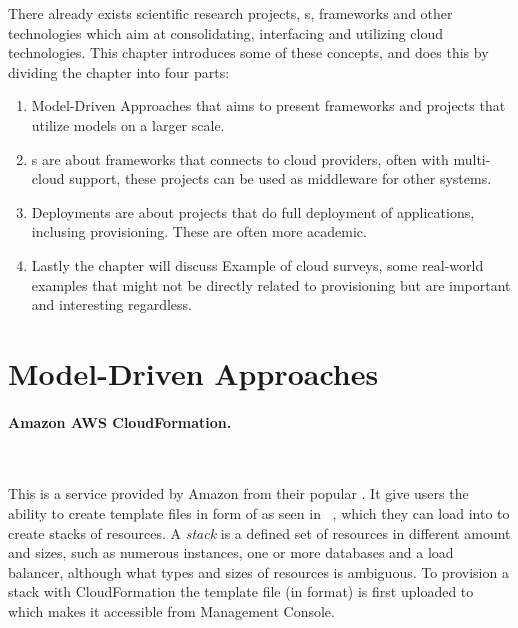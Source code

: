 
There already exists scientific research projects, s, frameworks 
and other technologies which aim at consolidating, interfacing and utilizing cloud technologies.
This chapter introduces some of these concepts, and does this by dividing the chapter into four parts:
\begin{enumerate}
  \item Model-Driven Approaches that aims to present frameworks and projects that utilize
  models on a larger scale.
  \item {}s are about frameworks that connects to cloud providers, often with multi-cloud support,
  these projects can be used as middleware for other systems.
  \item Deployments are about projects that do full deployment of applications, inclusing provisioning.
  These are often more academic.
  \item Lastly the chapter will discuss \iitem Example of cloud surveys, some real-world examples
  that might not be directly related to provisioning but are important and interesting regardless.
\end{enumerate}

\section{Model-Driven Approaches}

\paragraph{Amazon AWS CloudFormation.}~\cite{aws}



This is a service provided by Amazon from their popular .
It give users the ability to create template files in form of 
 as seen in ~, 
which they can load into  to create stacks of resources. 
A \emph{stack} is a defined set of resources in different amount and sizes, 
such as numerous instances,
one or more databases and a load balancer, although what types and sizes of resources is ambiguous.
To provision a stack with CloudFormation the template file (in  format) is first uploaded to
 which makes it accessible from  Management Console.

